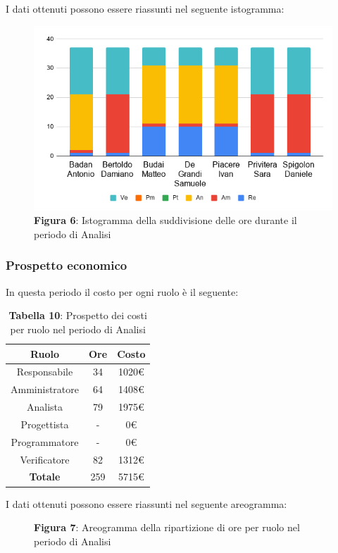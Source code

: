 I dati ottenuti possono essere riassunti nel seguente istogramma:
\begin{figure}[H]
	\centering
	\includegraphics[width=0.7\linewidth]{res/images/IstogrammaFase1.png}
	\caption*{\textbf{Figura 6}: Istogramma della suddivisione delle ore durante il periodo di Analisi}
	\label{fig:Figura2}
\end{figure}

\subsubsection{Prospetto economico}
In questa periodo il costo per ogni ruolo è il seguente:

\begin{table}[H]
	\centering
	\renewcommand{\arraystretch}{1.5}
	\begin{tabular}{|c|c|c|}
		\hline
		\rowcolor{lighter-grayer}
Ruolo & Ore & Costo \\ \hline
Responsabile & 34 & 1020\euro \\ \hline
Amministratore & 64 & 1408\euro \\ \hline
Analista & 79 & 1975\euro \\ \hline
Progettista & - & 0\euro \\ \hline
Programmatore & - & 0\euro \\ \hline
Verificatore & 82 & 1312\euro \\ \hline
\textbf{Totale} & 259 & 5715\euro \\ \hline
\end{tabular}
	\caption*{\textbf{Tabella 10}: Prospetto dei costi per ruolo nel periodo di Analisi\\}
\end{table}
I dati ottenuti possono essere riassunti nel seguente areogramma:
\begin{figure}[H]
	\centering
	\caption*{\textbf{Figura 7}:  Areogramma della ripartizione di ore per ruolo nel periodo di Analisi}
	\label{fig:Figura3}
\end{figure}	



